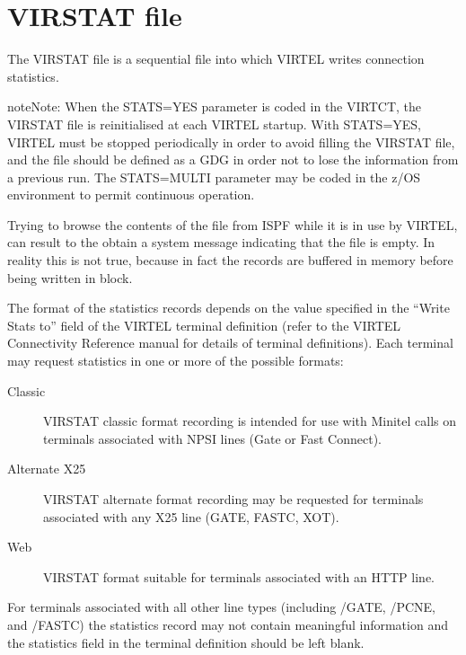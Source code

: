 \documentclass[letterpaper,10pt,english]{sphinxmanual}
\begin{document}
\section{VIRSTAT file}
\label{\detokenize{audit_operations_ and_performance:virstat-file}}\label{\detokenize{audit_operations_ and_performance:index-84}}
The VIRSTAT file is a sequential file into which VIRTEL writes connection statistics.

\begin{sphinxadmonition}{note}{Note:}
When the STATS=YES parameter is coded in the VIRTCT, the VIRSTAT file is reinitialised at each VIRTEL startup. With STATS=YES, VIRTEL must be stopped periodically in order to avoid filling the VIRSTAT
file, and the file should be defined as a GDG in order not to lose the information from a previous run. The STATS=MULTI parameter may be coded in the z/OS environment to permit continuous operation.

Trying to browse the contents of the file from ISPF while it is in use by VIRTEL, can result to the obtain a system message indicating that the file is empty. In reality this is not true, because in fact
the records are buffered in memory before being written in block.
\end{sphinxadmonition}

The format of the statistics records depends on the value specified in the “Write Stats to” field of the VIRTEL terminal definition (refer to the VIRTEL Connectivity Reference manual for details of terminal definitions). Each terminal may request statistics in one or more of the possible formats:
\begin{description}
\item[{Classic}] \leavevmode
VIRSTAT classic format recording is intended for use with Minitel calls on terminals associated with NPSI lines (Gate or Fast Connect).

\item[{Alternate X25}] \leavevmode
VIRSTAT alternate format recording may be requested for terminals associated with any X25 line (GATE, FASTC, XOT).

\item[{Web}] \leavevmode
VIRSTAT format suitable for terminals associated with an HTTP line.

\end{description}

For terminals associated with all other line types (including /GATE, /PCNE, and /FASTC) the statistics record may not contain meaningful information and the statistics field in the terminal definition     should be left blank.
\end{document}
